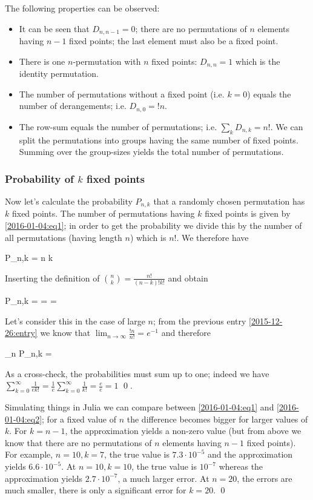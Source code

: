 The following properties can be observed:

\begin{itemize}
\item  It can be seen that $D_{n,n-1} = 0$; there are no permutations of $n$ elements having $n-1$ fixed points; the last element must also be a fixed point.
\item  There is one $n$-permutation with $n$ fixed points: $D_{n,n} = 1$ which is the identity permutation.
\item  The number of permutations without a fixed point (i.e. $k=0$) equals the number of derangements; i.e. $D_{n,0} = !n$.
\item  The row-sum equals the number of permutations; i.e. $\sum_{k} D_{n,k} = n!$. We can split the permutations into groups having the same number of fixed points. Summing over the group-sizes yields the total number of permutations.
\end{itemize}

\subsubsection{Probability of $k$ fixed points}

Now let's calculate the probability $P_{n,k}$ that a randomly chosen permutation has $k$ fixed points. The number of permutations having $k$ fixed points is given by \eqref{2016-01-04:eq1}; in order to get the probability we divide this by the number of all permutations (having length $n$) which is $n!$. We therefore have

\bee
P_{n,k} = {n \choose k} 
\eee

Inserting the definition of ${n \choose k} = \frac{n!}{(n-k)! k!}$ and obtain

\be\label{2016-01-04:eq1}
P_{n,k} =   =  =  
\ee

Let's consider this in the case of large $n$; from the previous entry \ref{2015-12-26:entry} we know that $\lim_{n \rightarrow \infty} \frac{!n}{n!} = e^{-1}$ and therefore

\be\label{2016-01-04:eq2}
\lim_{n \rightarrow \infty} P_{n,k} = 
\ee

As a cross-check, the probabilities must sum up to one; indeed we have $\sum_{k=0}^\infty \frac{1}{e k!} = \frac{1}{e} \sum_{k=0}^\infty \frac{1}{k!} = \frac{e}{e} = 1$ \qed.

Simulating things in Julia we can compare between \eqref{2016-01-04:eq1} and \eqref{2016-01-04:eq2}; for a fixed value of $n$ the difference becomes bigger for larger values of $k$. For $k=n-1$, the approximation yields a non-zero value (but from above we know that there are no permutations of $n$ elements having $n-1$ fixed points). For example, $n = 10, k=7$, the true value is $7.3 \cdot 10^{-5}$ and the approximation yields $6.6 \cdot 10^{-5}$. At $n = 10, k=10$, the true value is $10^{-7}$ whereas the approximation yields $2.7 \cdot 10^{-7}$, a much larger error. At $n=20$, the errors are much smaller, there is only a significant error for $k=20$. \qed


